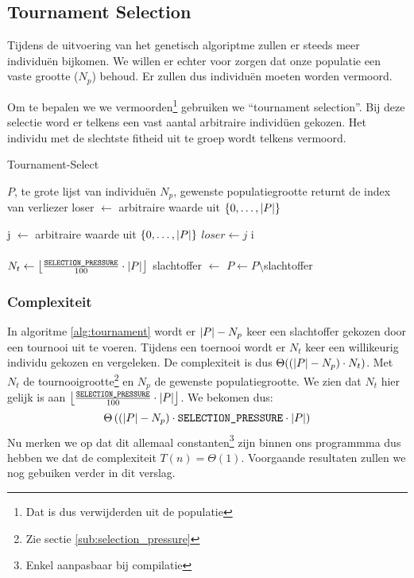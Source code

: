 \subsection{Tournament Selection}
\label{sub:tournament}
Tijdens de uitvoering van het genetisch algoriptme zullen er steeds meer individuën bijkomen. We willen er echter voor zorgen dat onze populatie een vaste grootte ($N_p$) behoud. Er zullen dus individuën moeten worden vermoord.

Om te bepalen we we vermoorden\footnote{Dat is dus verwijderden uit de populatie} gebruiken we ``tournament selection''. Bij deze selectie word er telkens een vast aantal arbitraire individüen gekozen. Het individu met de slechtste fitheid uit te groep wordt telkens vermoord.
	\begin{algorithm}[H]
	 	\caption{Tournament-Select}
		\begin{algorithmic}
		\Require 
			\State $P$, te grote lijst van individuën 
			\State $N_p$, gewenste populatiegrootte
		\Ensure returnt de index van verliezer
		\State loser $\gets$ arbitraire waarde uit $\lbrace 0, \dots, \lvert P \rvert \rbrace$

		\State j $\gets$ arbitraire waarde uit $\lbrace 0, \dots, \lvert P \rvert \rbrace$
			\State $loser \gets j$
		\EndIf
		\EndFor		
		\State \Return i
		\EndFunction
		\\
		\\
			\State $N_t \gets \left\lfloor\frac{\texttt{SELECTION\_PRESSURE}}{100} \cdot \lvert P \rvert\right\rfloor$ 
			\State slachtoffer $\gets$ 
			\State $P \gets P\setminus$slachtoffer
		\EndWhile
		
		\end{algorithmic}
		\label{alg:tournament}
	\end{algorithm}		
\subsubsection{Complexiteit}
In algoritme \ref{alg:tournament} wordt er $\lvert P \rvert-N_p$ keer een slachtoffer gekozen door een tournooi uit te voeren. Tijdens een toernooi wordt er $N_t$ keer een willikeurig individu gekozen en vergeleken. De complexiteit is dus $\Theta((\lvert P \rvert-N_p)\cdot N_t)$. Met $N_t$ de tournooigrootte\footnote{Zie sectie \ref{sub:selection_pressure}} en $N_p$ de gewenste populatiegrootte. We zien dat $N_t$ hier gelijk is aan
 $\left\lfloor\frac{\texttt{SELECTION\_PRESSURE}}{100} \cdot \lvert P \rvert\right\rfloor$.
 We bekomen dus: \[\Theta\left(\left(\lvert P \rvert-N_p\right)\cdot \texttt{SELECTION\_PRESSURE} \cdot \lvert P \rvert\right)\]
 Nu merken we op dat dit allemaal constanten\footnote{Enkel aanpasbaar bij compilatie} zijn binnen ons programmma dus hebben we dat de complexiteit $T(n) = \Theta(1)$. Voorgaande resultaten zullen we nog gebuiken verder in dit verslag. %

